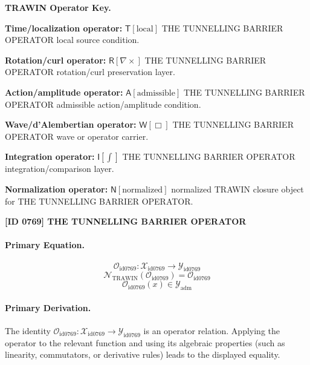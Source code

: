\par\vspace{0.45\baselineskip}
\noindent\begin{minipage}[t]{\linewidth}
\begingroup
\small
\raggedright
\textbf{TRAWIN Operator Key.}\par
\noindent\textbf{Time/localization operator:} $\mathsf{T}\!\left[\mathrm{local}\right]$ THE TUNNELLING BARRIER OPERATOR local source condition.\par
\noindent\textbf{Rotation/curl operator:} $\mathsf{R}\!\left[\nabla\times\right]$ THE TUNNELLING BARRIER OPERATOR rotation/curl preservation layer.\par
\noindent\textbf{Action/amplitude operator:} $\mathsf{A}\!\left[\mathrm{admissible}\right]$ THE TUNNELLING BARRIER OPERATOR admissible action/amplitude condition.\par
\noindent\textbf{Wave/d'Alembertian operator:} $\mathsf{W}\!\left[\Box\right]$ THE TUNNELLING BARRIER OPERATOR wave or operator carrier.\par
\noindent\textbf{Integration operator:} $\mathsf{I}\!\left[\int\right]$ THE TUNNELLING BARRIER OPERATOR integration/comparison layer.\par
\noindent\textbf{Normalization operator:} $\mathsf{N}\!\left[\mathrm{normalized}\right]$ normalized TRAWIN closure object for THE TUNNELLING BARRIER OPERATOR.\par
\endgroup
\end{minipage}

\clearpage
\noindent\textbf{[ID 0769] THE TUNNELLING BARRIER OPERATOR}\par
\vspace{0.35em}
\paragraph{Primary Equation.}
\[
\mathcal{O}_{\mathrm{id0769}}:\mathcal{X}_{\mathrm{id0769}}\longrightarrow\mathcal{Y}_{\mathrm{id0769}}
\]
\[
\mathcal{N}_{\mathrm{TRAWIN}}(\mathcal{O}_{\mathrm{id0769}})=\mathcal{O}_{\mathrm{id0769}}
\]
\[
\mathcal{O}_{\mathrm{id0769}}(x)\in\mathcal{Y}_{\mathrm{adm}}
\]

\paragraph{Primary Derivation.}
The identity \( \mathcal{O}_{\mathrm{id0769}}:\mathcal{X}_{\mathrm{id0769}}\longrightarrow\mathcal{Y}_{\mathrm{id0769}} \) is an operator relation. Applying the operator to the relevant function and using its algebraic properties (such as linearity, commutators, or derivative rules) leads to the displayed equality.
